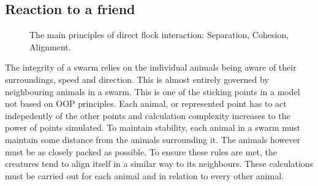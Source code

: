 \documentclass[
reprint,
showpacs,preprintnumbers,
amsmath,amssymb,
prl,
]{revtex4-1}
\begin{document}
\subsection{\label{sec:level2}Reaction to a friend}

\begin{figure}[!htp]
		\label{fig:boidseparation}
		\label{fig:boidcohesion}
		\label{fig:boidalignment}

	\caption{The main principles of direct flock interaction: Separation, Cohesion, Alignment.\cite{boids}}

	\label{fig:flockinteraction}
\end{figure}

The integrity of a swarm relies on the individual animals being aware of their surroundings, speed and direction.
This is almost entirely governed by neighbouring animals in a swarm.
This is one of the sticking points in a model not based on OOP principles.
Each animal, or represented point has to act indepedently of the other points and calculation complexity increases to the power of points simulated.
To maintain stability, each animal in a swarm must maintain some distance from the animals surrounding it.
The animals however must be as closely packed as possible.
To ensure these rules are met, the creatures tend to  align itself in a similar way to its neighbours.
These calculations must be carried out for each animal and in relation to every other animal.
\end{document}
